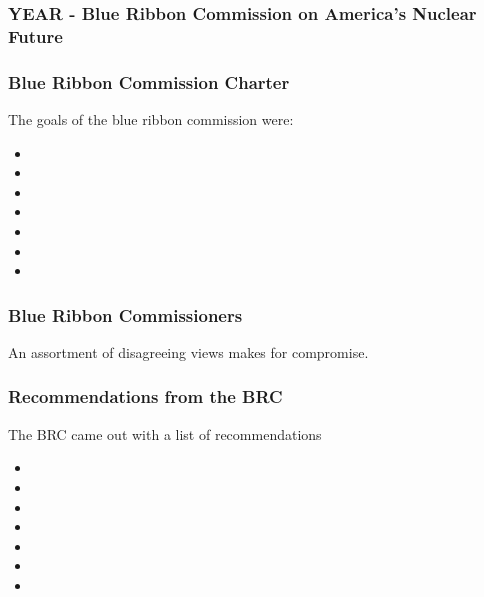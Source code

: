 
\begin{frame}[ctb!]
    \frametitle{YEAR - Blue Ribbon Commission on America's Nuclear Future}

  \end{frame}
\begin{frame}[ctb!]
    \frametitle{Blue Ribbon Commission Charter}
    The goals of the blue ribbon commission were:
    \begin{itemize}
      \item <++>
      \item <++>
      \item <++>
      \item <++>
      \item <++>
      \item <++>
      \item <++>
    \end{itemize}

  \end{frame}

\begin{frame}[ctb!]
    \frametitle{Blue Ribbon Commissioners}
    An assortment of disagreeing views makes for compromise.
  \end{frame}

\begin{frame}[ctb!]
    \frametitle{Recommendations from the BRC}
    The BRC came out with a list of recommendations
    \begin{itemize}
      \item <++>
      \item <++>
      \item <++>
      \item <++>
      \item <++>
      \item <++>
      \item <++>
    \end{itemize}
  \end{frame}



